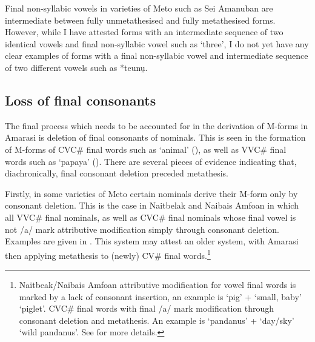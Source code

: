 \begin{exe}
	\label{ex:FGT-171013-1, 0.31}
	\label{ex:FGT-171016-2, 2.05}
\end{exe}

Final non-syllabic vowels in varieties of Meto such as Se{\Q}i Amanuban
are intermediate between fully unmetathesised and fully metathesised forms.
However, while I have attested forms with
an intermediate sequence of two identical vowels and
final non-syllabic vowel such as  {\ra}
 `three', I do not yet have any clear examples
of forms with a final non-syllabic vowel and intermediate
sequence of two different vowels such as *teunu̯.

\subsection{Loss of final consonants}\label{sec:LosFinCon}
The final process which needs to be accounted
for in the derivation of M-forms in Amarasi
is deletion of final consonants of nominals.
This is seen in the formation of M-forms of CVC{\#} final words
such as  {\ra}  `animal' (),
as well as VVC{\#} final words such as
 {\ra}  `papaya' ().
There are several pieces of evidence
indicating that, diachronically, final consonant
deletion preceded metathesis.

Firstly, in some varieties of Meto
certain nominals derive their M-form
only by consonant deletion.
This is the case in Naitbelak and Nai{\Q}bais Amfo{\Q}an
in which all VVC{\#} final nominals, as well as CVC{\#}
final nominals whose final vowel is not /a/ mark attributive
modification simply through consonant deletion.
Examples are given in .
This system may attest an older system, with Amarasi then
applying metathesis to (newly) CV{\#} final words.\footnote{
		Naitbeak/Nai{\Q}bais Amfo{\Q}an attributive modification
		for vowel final words is marked by a lack of consonant insertion,
		an example is  `pig' +  `small, baby' {\ra}  `piglet'.
		CVC{\#} final words with final /a/ mark modification through
		consonant deletion and metathesis. An example is
		 `pandanus' +  `day/sky' {\ra}  `wild pandanus'.
		See \cite{cu18} for more details.}

